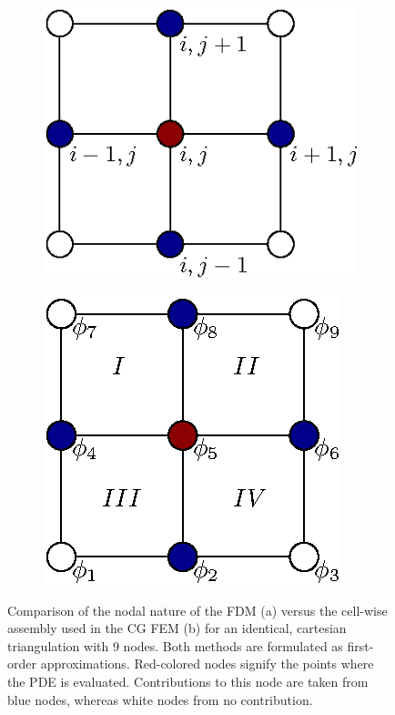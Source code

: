 \documentclass[asi,article,submit,moreauthors]{Definitions/mdpi}
\begin{document}
\begin{figure}[htbp!]
    \centering
    \captionsetup[subfigure]{justification=centering}
    \begin{subfigure}[t]{0.49\textwidth}
        \centering
        \includegraphics[]{Figs/Theory/fd-stencil-2d.eps}
        \caption{}
        \label{fig:fd-stencil-2d}
    \end{subfigure}
    \hfill
    \begin{subfigure}[t]{0.49\textwidth}
        \centering
        \includegraphics[]{Figs/Theory/cg-2d-collocation.eps}
        \caption{}
        \label{fig:cg-2d-collocatoin}
    \end{subfigure}
   \caption{Comparison of the nodal nature of the FDM (a) versus the cell-wise assembly used in the CG FEM (b) for an identical, cartesian triangulation with 9 nodes. Both methods are formulated as first-order approximations.
   Red-colored nodes signify the points where the PDE is evaluated. Contributions to this node are taken from blue nodes, whereas white nodes from no contribution.}
   \label{fig:fd-vs-cg-2d}
\end{figure}
\end{document}
